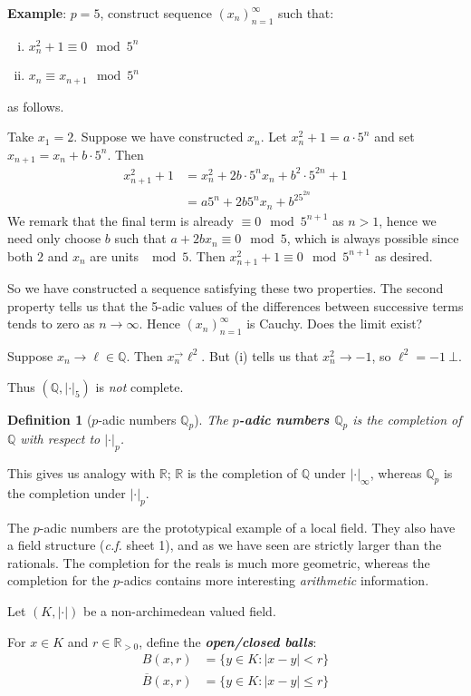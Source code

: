 \documentclass[]{article}
\theoremstyle{custhm}
\theoremstyle{cusdef}
\newtheorem{defin}[theorem]{Definition}
\theoremstyle{custhm}
\theoremstyle{custhm}
\theoremstyle{custhm}
\theoremstyle{custhm}
\theoremstyle{cusdef}
\theoremstyle{remark}
\newcommand{\Q}{\mathbb{Q}}
\newcommand{\R}{\mathbb{R}}
\newcommand{\ra}{\rightarrow}
\newcommand{\undf}[1]{\textit{\textbf{#1}}}
\renewcommand{\it}[1]{\textit{#1}}
\newcommand{\val}[1]{\left|#1\right|}
\newcommand{\valk}{(K,|\cdot|)}
\renewcommand{\bar}{\overline}
\begin{document}
\textbf{Example}: $p = 5$, construct sequence $(x_n)_{n=1}^{\infty}$ such that:
\begin{enumerate}[(i)]
	\item $x_n^2 + 1 \equiv 0 \mod 5^n$
	\item $x_n \equiv x_{n+1} \mod 5^n$
\end{enumerate}
as follows.

Take $x_1 = 2$. Suppose we have constructed $x_n$. Let $x_n^2 + 1 = a\cdot5^n$ and set $x_{n+1} = x_n + b\cdot5^n$. Then
\begin{align*}
	x_{n+1}^2 + 1 &= x_n^2 + 2b\cdot5^nx_n + b^2\cdot5^{2n} + 1\\
	&=a5^n + 2b5^nx_n + b^25^{2n}
\end{align*}
We remark that the final term is already $\equiv 0 \mod 5^{n+1}$ as $n > 1$, hence we need only choose $b$ such that $a + 2bx_n \equiv 0\mod 5$, which is always possible since both $2$ and $x_n$ are units $\mod 5$. Then $x_{n+1}^2 + 1 \equiv 0 \mod 5^{n+1}$ as desired.

So we have constructed a sequence satisfying these two properties. The second property tells us that the 5-adic values of the differences between successive terms tends to zero as $n\ra\infty$. Hence $(x_n)_{n=1}^{\infty}$ is Cauchy. Does the limit exist?

Suppose $x_n\ra \ell\in\Q$. Then $x_n^\ra\ell^2$. But (i) tells us that $x_n^2\ra-1$, so $\ell^2 = -1\ \bot$.

Thus $(\Q,|\cdot|_5)$ is \it{not} complete.

\begin{defin}[$p$-adic numbers $\Q_p$]
The \undf{$p$-adic numbers $\Q_p$} is the completion of $\Q$ with respect to $|\cdot|_p$.
\end{defin}

This gives us analogy with $\R$; $\R$ is the completion of $\Q$ under $|\cdot|_{\infty}$, whereas $\Q_p$ is the completion under $|\cdot|_p$.

The $p$-adic numbers are the prototypical example of a local field. They also have a field structure (\it{c.f.} sheet 1), and as we have seen are strictly larger than the rationals. The completion for the reals is much more geometric, whereas the completion for the $p$-adics contains more interesting \it{arithmetic} information.

Let $\valk$ be a non-archimedean valued field.

For $x\in K$ and $r\in \R_{>0}$, define the \undf{open/closed balls}:
\begin{align*}
	B(x,r) &= \{y\in K: \val{x-y} < r\}\\
	\bar{B}(x,r)&=\{y\in K:|x-y|\le r\}
\end{align*}
\end{document}
